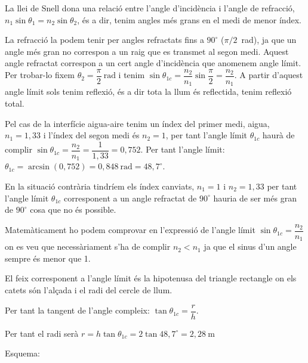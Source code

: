 \begin{solapartat}
 La llei de Snell dona una relació entre l'angle d'incidència i l'angle de refracció, $n_1\sin\theta_1 = n_2\sin\theta_2$, és a dir, tenim angles més grans en el medi de menor índex.

 La refracció la podem tenir per angles refractats fins a $90^\circ$ ($\pi/2$~rad), ja que un angle més gran no correspon a un raig que es transmet al segon medi. Aquest angle refractat correspon a un cert angle d'incidència que anomenem angle límit. Per trobar-lo fixem $\theta_2 = \dfrac{\pi}{2}\ \mathrm{rad}$ i tenim $\sin\theta_{1c} = \dfrac{n_2}{n_1}\sin\dfrac{\pi}{2} = \dfrac{n_2}{n_1}$. A partir d'aquest angle límit sols tenim reflexió, és a dir tota la llum és reflectida, tenim reflexió total.


 Pel cas de la interfície aigua-aire tenim un índex del primer medi, aigua, $n_1 = 1,33$ i l'índex del segon medi és $n_2 = 1$, per tant l'angle límit $\theta_{1c}$ haurà de complir $\sin\theta_{1c} = \dfrac{n_2}{n_1} = \dfrac{1}{1,33} = 0,752$. Per tant l'angle límit: $\theta_{1c} = \arcsin(0,752) = 0,848\ \mathrm{rad} = 48,7^\circ$.

 En la situació contrària tindríem els índex canviats, $n_1 = 1$ i $n_2 = 1,33$ per tant l'angle límit $\theta_{1c}$ corresponent a un angle refractat de $90^\circ$ hauria de ser més gran de $90^\circ$ cosa que no és possible.

 Matemàticament ho podem comprovar en l'expressió de l'angle límit $\sin\theta_{1c} = \dfrac{n_2}{n_1}$ on es veu que necessàriament s'ha de complir $n_2 < n_1$ ja que el sinus d'un angle sempre és menor que 1.
\end{solapartat}

\begin{solapartat}
 El feix corresponent a l'angle límit és la hipotenusa del triangle rectangle on els catets són l'alçada i el radi del cercle de llum.

 Per tant la tangent de l'angle compleix: $\tan\theta_{1c} = \dfrac{r}{h}$.

 Per tant el radi serà $r = h\tan\theta_{1c} = 2\tan 48,7^\circ = 2,28\ \mathrm{m}$

 Esquema:
\end{solapartat}
